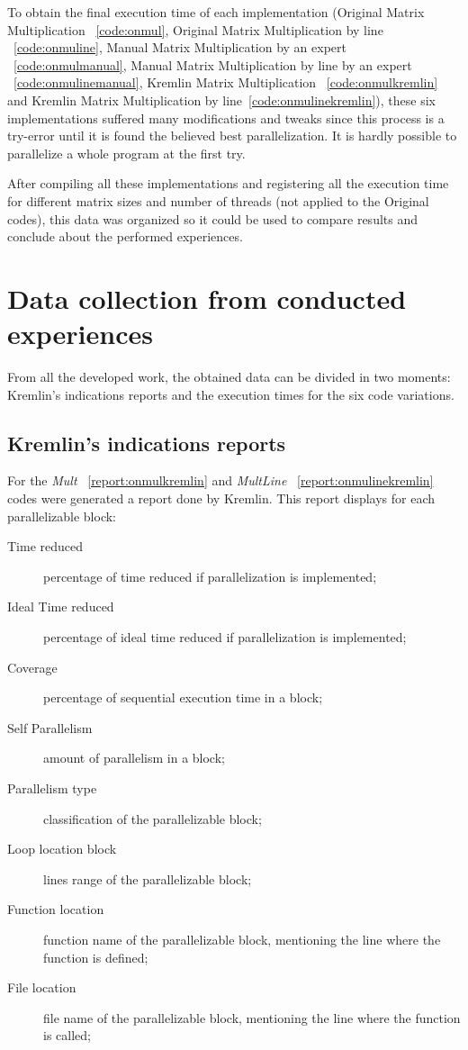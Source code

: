 To obtain the final execution time of each implementation (Original Matrix Multiplication ~\ref{code:onmul}, Original Matrix Multiplication by line ~\ref{code:onmuline}, Manual Matrix Multiplication by an expert ~\ref{code:onmulmanual}, Manual Matrix Multiplication by line by an expert ~\ref{code:onmulinemanual}, Kremlin Matrix Multiplication ~\ref{code:onmulkremlin} and Kremlin Matrix Multiplication by line~\ref{code:onmulinekremlin}), these six implementations suffered many modifications and tweaks since this process is a try-error until it is found the believed best parallelization. It is hardly possible to parallelize a whole program at the first try.

After compiling all these implementations and registering all the execution time for different matrix sizes and number of threads (not applied to the Original codes), this data was organized so it could be used to compare results and conclude about the performed experiences.

\section{Data collection from conducted experiences}

From all the developed work, the obtained data can be divided in two moments: Kremlin's indications reports and the execution times for the six code variations.

\subsection{Kremlin's indications reports} 

For the \textit{Mult} ~\ref{report:onmulkremlin} and \textit{MultLine} ~\ref{report:onmulinekremlin} codes were generated a report done by Kremlin. This report displays for each parallelizable block:

\begin{description}
	\item[Time reduced] percentage of time reduced if parallelization is implemented;
	\item[Ideal Time reduced] percentage of  ideal time reduced if parallelization is implemented;
	\item[Coverage] percentage of sequential execution time in a block;
	\item[Self Parallelism] amount of parallelism in a block;
	\item[Parallelism type] classification of the parallelizable block;
	\item[Loop location block] lines range of the parallelizable block;
	\item[Function location] function name of the parallelizable block, mentioning the line where the function is defined;
	\item[File location] file name of the parallelizable block, mentioning the line where the function is called;
\end{description}

